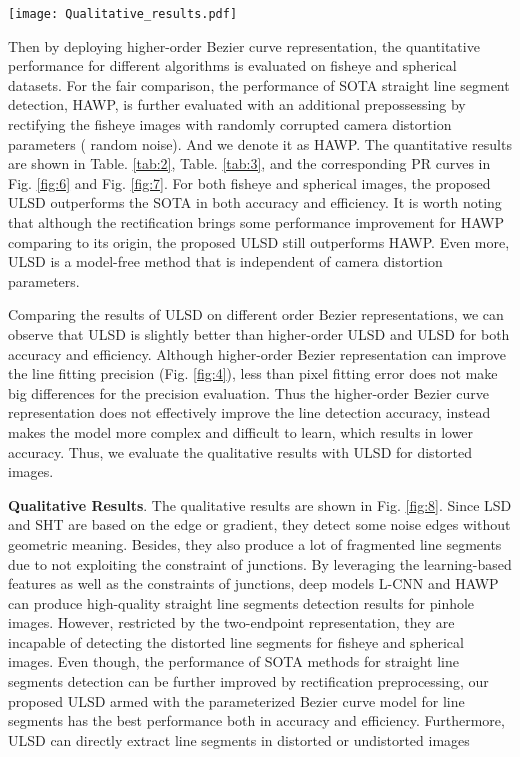 \documentclass[letterpaper, 10 pt, conference]{ieeeconf}
\begin{document}
\begin{figure*}[h!] 
	\centering
	\begin{center}
		\texttt{[image: Qualitative\_results.pdf]}
	\end{center}
	\caption{Qualitative results and comparisons. Rows: (a)-(b) pinhole case, (c)-(d) fisheye case, (e)-(g) spherical case}
	\label{fig:8}
\end{figure*}


Then by deploying higher-order Bezier curve representation, the quantitative performance for different algorithms is evaluated on fisheye and spherical datasets. For the fair comparison, the performance of SOTA straight line segment detection, HAWP, is further evaluated with an additional prepossessing by rectifying the fisheye images with randomly corrupted camera distortion parameters ( random noise). And we denote it as HAWP. The quantitative results are shown in Table. \ref{tab:2}, Table. \ref{tab:3}, and the corresponding PR curves in Fig. \ref{fig:6} and Fig. \ref{fig:7}. For both fisheye and spherical images, the proposed ULSD outperforms the SOTA in both accuracy and efficiency. It is worth noting that although the rectification brings some performance improvement for HAWP comparing to its origin, the proposed ULSD still outperforms HAWP. Even more, ULSD is a model-free method that is independent of camera distortion parameters.

Comparing the results of ULSD on different order Bezier representations, we can observe that ULSD is slightly better than higher-order ULSD and ULSD for both accuracy and efficiency. Although higher-order Bezier representation can improve the line fitting precision (Fig. \ref{fig:4}), less than  pixel fitting error does not make big differences for the precision evaluation. Thus the higher-order Bezier curve representation does not effectively improve the line detection accuracy, instead makes the model more complex and difficult to learn, which results in lower accuracy. Thus, we evaluate the qualitative results with ULSD for distorted images.

\noindent \textbf{Qualitative Results}. The qualitative results are shown in Fig. \ref{fig:8}. Since LSD and SHT are based on the edge or gradient, they detect some noise edges without geometric meaning. Besides, they also produce a lot of fragmented line segments due to not exploiting the constraint of junctions. By leveraging the learning-based features as well as the constraints of junctions, deep models L-CNN and HAWP can produce high-quality straight line segments detection results for pinhole images. However, restricted by the two-endpoint representation, they are incapable of detecting the distorted line segments for fisheye and spherical images. Even though, the performance of SOTA methods for straight line segments detection can be further improved by rectification preprocessing, our proposed ULSD armed with the parameterized Bezier curve model for line segments has the best performance both in accuracy and efficiency. Furthermore, ULSD can directly extract line segments in distorted or undistorted images
\end{document}
